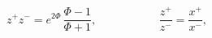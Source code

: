 \begin{equation}
z^{+}z^{-}=e^{2\Phi }\,\frac{\Phi -1}{\Phi +1},\,\ \ \ \ \ \ \ \ \ \ \ \ \ \
\ \ \ \ \ \ \ \ \ \ \frac{z^{+}}{z^{-}}=\frac{x^{+}}{x^{-}},
\label{confcoord}
\end{equation}

